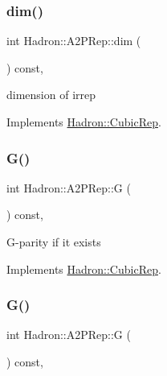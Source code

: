 \subsubsection{\texorpdfstring{dim()}{dim()}\hspace{0.1cm}{\footnotesize\ttfamily [3/3]}}
{\footnotesize\ttfamily int Hadron\+::\+A2\+P\+Rep\+::dim (\begin{DoxyParamCaption}{ }\end{DoxyParamCaption}) const\hspace{0.3cm}{\ttfamily [inline]}, {\ttfamily [virtual]}}

dimension of irrep 

Implements \mbox{\hyperlink{structHadron_1_1CubicRep_ac178d14064f037a66af4b9fb4b312d51}{Hadron\+::\+Cubic\+Rep}}.

\mbox{\label{structHadron_1_1A2PRep_a5011ad34ac95356b12a9da490244e399}} 
\subsubsection{\texorpdfstring{G()}{G()}\hspace{0.1cm}{\footnotesize\ttfamily [1/3]}}
{\footnotesize\ttfamily int Hadron\+::\+A2\+P\+Rep\+::G (\begin{DoxyParamCaption}{ }\end{DoxyParamCaption}) const\hspace{0.3cm}{\ttfamily [inline]}, {\ttfamily [virtual]}}

G-\/parity if it exists 

Implements \mbox{\hyperlink{structHadron_1_1CubicRep_a52104e43266d1614c00bbd1c3b395458}{Hadron\+::\+Cubic\+Rep}}.

\mbox{\label{structHadron_1_1A2PRep_a5011ad34ac95356b12a9da490244e399}} 
\subsubsection{\texorpdfstring{G()}{G()}\hspace{0.1cm}{\footnotesize\ttfamily [2/3]}}
{\footnotesize\ttfamily int Hadron\+::\+A2\+P\+Rep\+::G (\begin{DoxyParamCaption}{ }\end{DoxyParamCaption}) const\hspace{0.3cm}{\ttfamily [inline]}, {\ttfamily [virtual]}}

